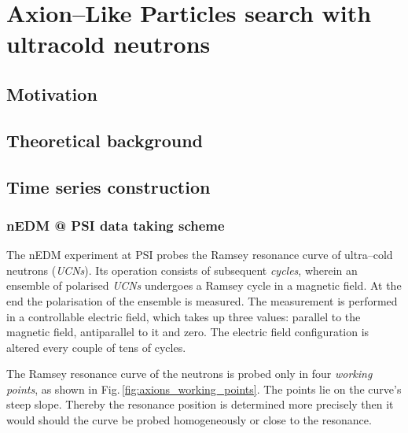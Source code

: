 \chapter{Axion--Like Particles search with ultracold neutrons}

\label{ch:axions}

\section{Motivation}


\section{Theoretical background}


\section{Time series construction}

\subsection{nEDM @ PSI data taking scheme}
The nEDM experiment at PSI probes the Ramsey resonance curve of ultra--cold neutrons (\emph{UCNs}). Its operation consists of subsequent \emph{cycles}, wherein an ensemble of polarised \emph{UCNs} undergoes a Ramsey cycle in a magnetic field. At the end the polarisation of the ensemble is measured. The measurement is performed in a controllable electric field, which takes up three values: parallel to the magnetic field, antiparallel to it and zero. The electric field configuration is altered every couple of tens of cycles.

The Ramsey resonance curve of the neutrons is probed only in four \emph{working points}, as shown in Fig.\,\ref{fig:axions_working_points}. The points lie on the curve's steep slope. Thereby the resonance position is determined more precisely then it would should the curve be probed homogeneously or close to the resonance.

